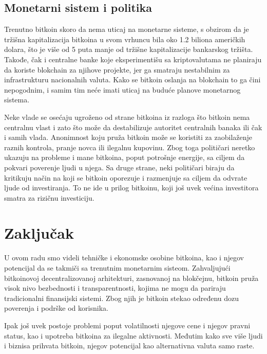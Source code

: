 \documentclass[a4paper]{article}
\begin{document}
\subsection{Monetarni sistem i politika}

Trenutno bitkoin skoro da nema uticaj na monetarne sisteme, s obzirom da je tržišna kapitalizacija bitkoina u svom vrhuncu bila oko 1.2 biliona američkih dolara, što je više od 5 puta manje od tržišne kapitalizacije bankarskog tržišta. Takođe, čak i centralne banke koje eksperimentišu sa kriptovalutama ne planiraju da koriste blokchain za njihove projekte, jer ga smatraju nestabilnim za infrastrukturu nacionalnih valuta. Kako se bitkoin oslanja na blokchain to ga čini nepogodnim, i samim tim neće imati uticaj na buduće planove monetarnog sistema.

Neke vlade se osećaju ugroženo od strane bitkoina iz razloga što bitkoin nema centralnu vlast i zato što može da destabilizuje autoritet centralnih banaka ili čak i samih vlada. Anonimnost koju pruža bitkoin može se koristiti za zaobilaženje raznih kontrola, pranje novca ili ilegalnu kupovinu. Zbog toga političari neretko ukazuju na probleme i mane bitkoina, poput potrošnje energije, sa ciljem da pokvari poverenje ljudi u njega. Sa druge strane, neki političari biraju da kritikuju način na koji se bitkoin oporezuje i razmenjuje sa ciljem da odvrate ljude od investiranja. To ne ide u prilog bitkoinu, koji još uvek većina investitora smatra za rizičnu investiciju.


\section{Zaključak}

U ovom radu smo videli tehničke i ekonomske osobine bitkoina, kao i njegov potencijal da se takmiči sa trenutnim monetarnim sisteom.
Zahvaljujući  bitkoinovoj decentralizovanoj arhitekturi, zasnovanoj na blokčejnu, bitkoin pruža visok nivo bezbednosti i transparentnosti, kojima ne mogu da pariraju tradicionalni finansijski sistemi. Zbog njih je bitkoin stekao određenu dozu poverenja i podrške od korisnika.

Ipak još uvek postoje problemi poput volatilnosti njegove cene i njegov pravni status, kao i upotreba bitkoina za ilegalne aktivnosti.
Međutim kako sve više ljudi i biznisa prihvata bitkoin, njegov potencijal kao alternativna valuta samo raste.

\clearpage

\appendix
\end{document}
